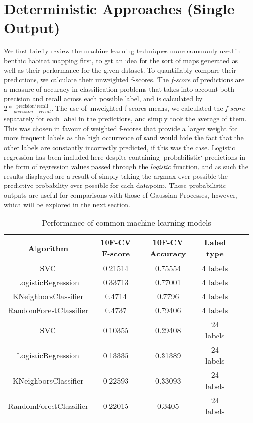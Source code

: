 \section{Deterministic Approaches (Single Output)}

We first briefly review the machine learning techniques more commonly used in benthic habitat mapping first, to get an idea for the sort of maps generated as well as their performance for the given dataset. To quantifiably compare their predictions, we calculate their unweighted f-scores. The \textit{f-score} of predictions are a measure of accuracy in classification problems that takes into account both precision and recall across each possible label, and is calculated by $2*\frac{\text{precision*recall}}{precision+recall}$. The use of unweighted f-scores means, we calculated the \textit{f-score} separately for each label in the predictions, and simply took the average of them. This was chosen in favour of weighted f-scores that provide a larger weight for more frequent labels as the high occurrence of sand would hide the fact that the other labels are constantly incorrectly predicted, if this was the case. Logistic regression has been included here despite containing 'probabilistic` predictions in the form of regression values passed through the \textit{logistic} function, and as such the results displayed are a result of simply taking the argmax over possible the predictive probability over possible for each datapoint. Those probabilistic outputs are useful for comparisons with those of Gaussian Processes, however, which will be explored in the next section. 

\begin{table}
    \centering
\begin{tabular}{|c|c|c|c|c|c|}
    \hline
    Algorithm & 10F-CV F-score & 10F-CV Accuracy & Label type\\\hline
    SVC & 0.21514 & 0.75554 & 4 labels \\
    LogisticRegression & 0.33713 & 0.77001 & 4 labels \\
    KNeighborsClassifier & 0.4714 & 0.7796 & 4 labels \\
    RandomForestClassifier & 0.4737 & 0.79406 & 4 labels \\
    SVC & 0.10355 & 0.29408 & 24 labels \\
    LogisticRegression & 0.13335 & 0.31389 & 24 labels \\
    KNeighborsClassifier & 0.22593 & 0.33093 & 24 labels \\
    RandomForestClassifier & 0.22015 & 0.3405 & 24 labels \\
    \hline
\end{tabular}
\label{table:detresults}
    \caption{Performance of common machine learning models}
\end{table}

